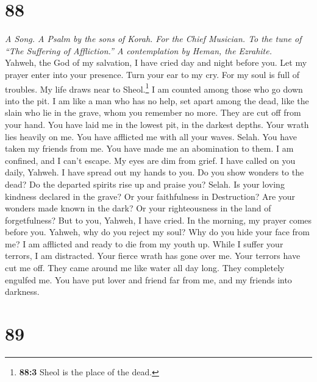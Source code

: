 \hypertarget{section-87}{%
\section{88}\label{section-87}}

\emph{A Song. A Psalm by the sons of Korah. For the Chief Musician. To
the tune of ``The Suffering of Affliction.'' A contemplation by Heman,
the Ezrahite.}\\
 Yahweh, the God of my salvation, I have cried day and
night before you.  Let my prayer enter into your presence.
Turn your ear to my cry.  For my soul is full of troubles.
My life draws near to Sheol.\footnote{\textbf{88:3} Sheol is the place
  of the dead.}  I am counted among those who go down into
the pit. I am like a man who has no help,  set apart among
the dead, like the slain who lie in the grave, whom you remember no
more. They are cut off from your hand.  You have laid me
in the lowest pit, in the darkest depths.  Your wrath lies
heavily on me. You have afflicted me with all your waves. Selah.
 You have taken my friends from me. You have made me an
abomination to them. I am confined, and I can't escape. 
My eyes are dim from grief. I have called on you daily, Yahweh. I have
spread out my hands to you.  Do you show wonders to the
dead? Do the departed spirits rise up and praise you? Selah.
 Is your loving kindness declared in the grave? Or your
faithfulness in Destruction?  Are your wonders made known
in the dark? Or your righteousness in the land of forgetfulness?
 But to you, Yahweh, I have cried. In the morning, my
prayer comes before you.  Yahweh, why do you reject my
soul? Why do you hide your face from me?  I am afflicted
and ready to die from my youth up. While I suffer your terrors, I am
distracted.  Your fierce wrath has gone over me. Your
terrors have cut me off.  They came around me like water
all day long. They completely engulfed me.  You have put
lover and friend far from me, and my friends into darkness.

\hypertarget{section-88}{%
\section{89}\label{section-88}}

